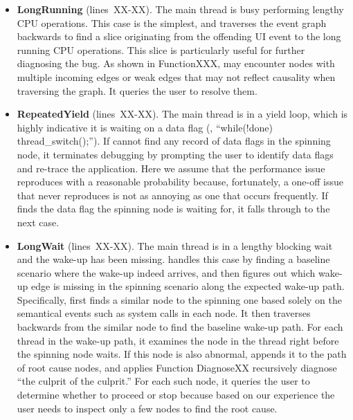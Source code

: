 \begin{itemize}

  \item \textbf{LongRunning} (lines~XX-XX). The main thread is busy
    performing lengthy CPU operations.  This case is the simplest, and
    \xxx traverses the event graph backwards to find a slice originating
    from the offending UI event to the long running CPU operations.  This
    slice is particularly useful for further diagnosing the bug.  As shown
    in FunctionXXX, \xxx may encounter nodes with multiple incoming edges
    or weak edges that may not reflect causality when traversing the
    graph.  It queries the user to resolve them.

  \item \textbf{RepeatedYield} (lines~XX-XX). The main thread is in a
    yield loop, which is highly indicative it is waiting on a data flag
    (\eg, ``while(!done) thread\_switch();'').  If \xxx cannot find any
    record of data flags in the spinning node, it terminates debugging by
    prompting the user to identify data flags and re-trace the
    application.  Here we assume that the performance issue reproduces
    with a reasonable probability because, fortunately, a one-off issue
    that never reproduces is not as annoying as one that occurs
    frequently.  If \xxx finds the data flag the spinning node is waiting
    for, it falls through to the next case.

  \item \textbf{LongWait} (lines~XX-XX). The main thread is in a lengthy
    blocking wait and the wake-up has been missing.  \xxx handles this
    case by finding a baseline scenario where the wake-up indeed arrives,
    and then figures out which wake-up edge is missing in the spinning
    scenario along the expected wake-up path.  Specifically, \xxx first
    finds a similar node to the spinning one based solely on the
    semantical events such as system calls in each node.  It then
    traverses backwards from the similar node to find the baseline wake-up
    path.  For each thread in the wake-up path, it examines the node in
    the thread right before the spinning node waits.  If this node is also
    abnormal, \xxx appends it to the path of root cause nodes, and applies
    Function DiagnoseXX recursively diagnose ``the culprit of the
    culprit.''  For each such node, it queries the user to determine
    whether to proceed or stop because based on our experience the user
    needs to inspect only a few nodes to find the root cause.

\end{itemize}

